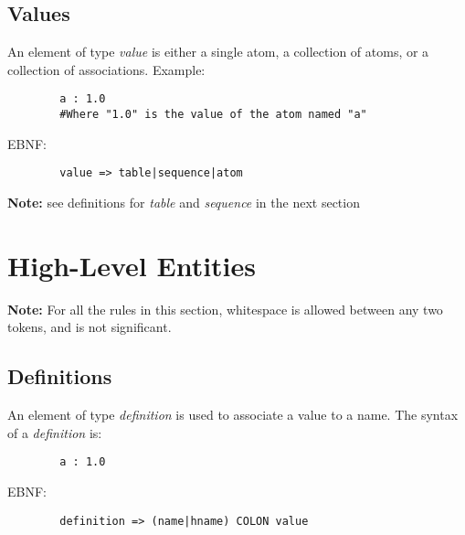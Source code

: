 \documentclass{memarticle}
\begin{document}
{                \subsection{Values}
                        An element of type \emph{value} is either a single atom, 
                        a collection of atoms,
                        or a collection of associations.
                        Example:
                        \begin{verbatim}
        a : 1.0
        #Where "1.0" is the value of the atom named "a"
                        \end{verbatim}
                        
                        \par
                        EBNF:
                        \begin{verbatim}
        value => table|sequence|atom
                        \end{verbatim}  
                        \par
                        \textbf{ Note: } see definitions for \emph{table} 
                        and \emph{sequence} 
                        in the next section
        \section{High-Level Entities}
                \textbf{ Note: } For all the rules in this section,
                whitespace is allowed between any two tokens,
                and is not significant.
                                                
                \subsection{Definitions}
                        An element of type \emph{definition} is used to associate a value to a name.
                        The syntax of a \emph{definition} is:
                        \begin{verbatim}
        a : 1.0
                        \end{verbatim}
                        \par
                        EBNF:
                        \begin{verbatim}
        definition => (name|hname) COLON value
                        \end{verbatim}  
}
\end{document}
